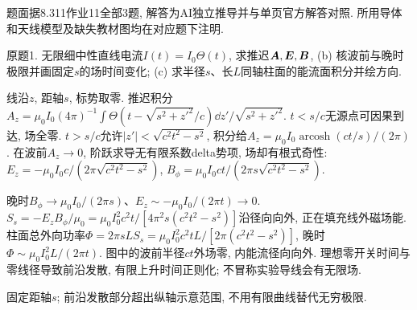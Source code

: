 题面据8.311作业11全部3题, 解答为AI独立推导并与单页官方解答对照. 所用导体和天线模型及缺失教材图均在对应题下注明.
\begin{exercise}
原题1. 无限细中性直线电流$I(t)=I_0\Theta(t)$, 求推迟$\boldsymbol{A},\boldsymbol{E},\boldsymbol{B}$, (b) 核波前与晚时极限并画固定$s$的场时间变化; (c) 求半径$s$、长$L$同轴柱面的能流面积分并绘方向.
\end{exercise}
\begin{solution}
线沿$z$, 距轴$s$, 标势取零. 推迟积分
$A_z=\mu_0I_0(4\pi)^{-1}\int\Theta(t-\sqrt{s^2+z'^2}/c)\dd z'/\sqrt{s^2+z'^2}$.
$t<s/c$无源点可因果到达, 场全零. $t>s/c$允许$|z'|<\sqrt{c^2t^2-s^2}$, 积分给$A_z=\mu_0I_0\operatorname{arcosh}(ct/s)/(2\pi)$. 在波前$A_z\to0$, 阶跃求导无有限系数delta势项, 场却有根式奇性:
$E_z=-\mu_0I_0c/(2\pi\sqrt{c^2t^2-s^2})$,
$B_\phi=\mu_0I_0ct/(2\pi s\sqrt{c^2t^2-s^2})$.

晚时$B_\phi\to\mu_0I_0/(2\pi s)$、$E_z\sim-\mu_0I_0/(2\pi t)\to0$. $S_s=-E_zB_\phi/\mu_0=\mu_0I_0^2c^2t/[4\pi^2s(c^2t^2-s^2)]$沿径向向外, 正在填充线外磁场能. 柱面总外向功率$\Phi=2\pi sL S_s=\mu_0I_0^2c^2tL/[2\pi(c^2t^2-s^2)]$, 晚时$\Phi\sim\mu_0I_0^2L/(2\pi t)$. 图中的波前半径$ct$外场零, 内能流径向向外. 理想零开关时间与零线径导致前沿发散, 有限上升时间正则化; 不冒称实验导线会有无限场.
\begin{center}\par
固定距轴$s$; 前沿发散部分超出纵轴示意范围, 不用有限曲线替代无穷极限.
\end{center}
\begin{center}\end{center}
\end{solution}
